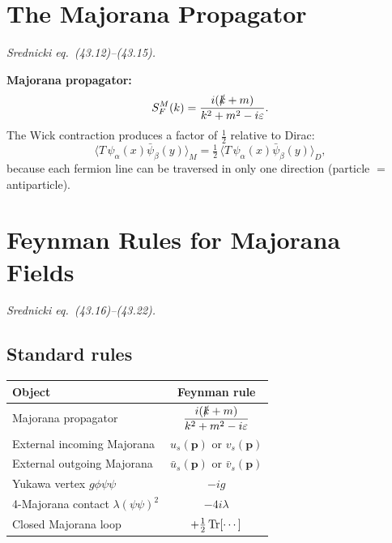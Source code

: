 \section{The Majorana Propagator}

\textit{Srednicki eq.\ (43.12)--(43.15).}

\begin{mdframed}[backgroundcolor=blue!5]
\textbf{Majorana propagator:}
\begin{equation}\label{eq:majorana-prop}
  S_F^M(k) = \frac{i(\slashed{k}+m)}{k^2+m^2-i\varepsilon}.
\end{equation}
The Wick contraction produces a factor of $\tfrac{1}{2}$ relative to Dirac:
\begin{equation}
  \langle T\,\psi_\alpha(x)\bar\psi_\beta(y)\rangle_M
  = \tfrac{1}{2}\,\langle T\,\psi_\alpha(x)\bar\psi_\beta(y)\rangle_D,
\end{equation}
because each fermion line can be traversed in only one direction (particle $=$ antiparticle).
\end{mdframed}

\section{Feynman Rules for Majorana Fields}

\textit{Srednicki eq.\ (43.16)--(43.22).}

\subsection{Standard rules}

\begin{center}
\begin{tabular}{lc}
\toprule
Object & Feynman rule \\
\midrule
Majorana propagator & $\displaystyle\frac{i(\slashed{k}+m)}{k^2+m^2-i\varepsilon}$ \\[8pt]
External incoming Majorana & $u_s(\mathbf{p})$ or $v_s(\mathbf{p})$ \\
External outgoing Majorana & $\bar u_s(\mathbf{p})$ or $\bar v_s(\mathbf{p})$ \\
Yukawa vertex $g\phi\psi\psi$ & $-ig$ \\
4-Majorana contact $\lambda(\psi\psi)^2$ & $-4i\lambda$ \\
Closed Majorana loop & $+\tfrac{1}{2}\operatorname{Tr}[\cdots]$ \\
\bottomrule
\end{tabular}
\end{center}

